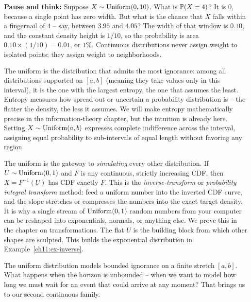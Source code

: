 \begin{walkbox}
\textbf{Pause and think:} Suppose $X \sim \Unif(0, 10)$. What is $\P(X = 4)$? It is $0$, because a single point has zero width. But what is the chance that $X$ falls within a fingernail of $4$ -- say, between $3.95$ and $4.05$? The width of that window is $0.10$, and the constant density height is $1/10$, so the probability is area $0.10 \times (1/10) = 0.01$, or $1\%$. Continuous distributions never assign weight to isolated points; they assign weight to neighborhoods.
\end{walkbox}

\begin{aestheticbox}
The uniform is the distribution that admits the most ignorance: among
all distributions supported on $[a,b]$ (meaning they take values only in this interval), it is the one with the largest entropy,
the one that assumes the least. Entropy measures how spread out or uncertain a
probability distribution is -- the flatter the density, the less it assumes. We
will make entropy mathematically precise in the information-theory chapter, but
the intuition is already here. Setting $X\sim\Unif(a,b)$ expresses complete
indifference across the interval, assigning equal probability to sub-intervals of
equal length without favoring any region.
\end{aestheticbox}

\begin{connectionbox}
The uniform is the gateway to \emph{simulating} every other distribution. If
$U\sim\Unif(0,1)$ and $F$ is any continuous, strictly increasing CDF, then
$X = F^{-1}(U)$ has CDF exactly $F$. This is the \emph{inverse-transform} or
\emph{probability integral transform} method: feed a uniform number into the
inverted CDF curve, and the slope stretches or compresses the numbers into the
exact target density. It is why a single stream of $\Unif(0,1)$ random numbers
from your computer can be reshaped into exponentials, normals, or anything else.
We prove this in the chapter on transformations. The flat $U$ is the building block from which other shapes are sculpted. This builds the exponential distribution in Example~\ref{ch11:ex-inverse}.
\end{connectionbox}

The uniform distribution models bounded ignorance on a finite stretch $[a,b]$.
What happens when the horizon is unbounded -- when we want to model how long we
must wait for an event that could arrive at any moment? That brings us to our
second continuous family.
